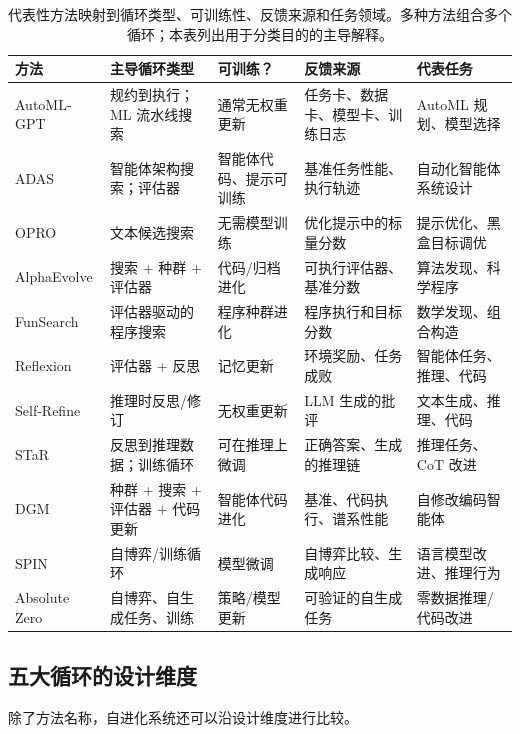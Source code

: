 \begin{table}[htbp]
\centering
\small
\caption{代表性方法映射到循环类型、可训练性、反馈来源和任务领域。多种方法组合多个循环；本表列出用于分类目的的主导解释。}
\label{tab:ch2-method-loop-comparison}
\begin{tabular}{p{2cm}p{2.8cm}p{1.5cm}p{3cm}p{3cm}}
\toprule
\textbf{方法} & \textbf{主导循环类型} & \textbf{可训练？} & \textbf{反馈来源} & \textbf{代表任务} \\
\midrule
AutoML-GPT & 规约到执行；ML 流水线搜索 & 通常无权重更新 & 任务卡、数据卡、模型卡、训练日志 & AutoML 规划、模型选择 \\
ADAS & 智能体架构搜索；评估器 & 智能体代码、提示可训练 & 基准任务性能、执行轨迹 & 自动化智能体系统设计 \\
OPRO & 文本候选搜索 & 无需模型训练 & 优化提示中的标量分数 & 提示优化、黑盒目标调优 \\
AlphaEvolve & 搜索 + 种群 + 评估器 & 代码/归档进化 & 可执行评估器、基准分数 & 算法发现、科学程序 \\
FunSearch & 评估器驱动的程序搜索 & 程序种群进化 & 程序执行和目标分数 & 数学发现、组合构造 \\
Reflexion & 评估器 + 反思 & 记忆更新 & 环境奖励、任务成败 & 智能体任务、推理、代码 \\
Self-Refine & 推理时反思/修订 & 无权重更新 & LLM 生成的批评 & 文本生成、推理、代码 \\
STaR & 反思到推理数据；训练循环 & 可在推理上微调 & 正确答案、生成的推理链 & 推理任务、CoT 改进 \\
DGM & 种群 + 搜索 + 评估器 + 代码更新 & 智能体代码进化 & 基准、代码执行、谱系性能 & 自修改编码智能体 \\
SPIN & 自博弈/训练循环 & 模型微调 & 自博弈比较、生成响应 & 语言模型改进、推理行为 \\
Absolute Zero & 自博弈、自生成任务、训练 & 策略/模型更新 & 可验证的自生成任务 & 零数据推理/代码改进 \\
\bottomrule
\end{tabular}
\end{table}

\subsection{五大循环的设计维度}\label{sec:ch2-design-dimensions}

除了方法名称，自进化系统还可以沿设计维度进行比较。

